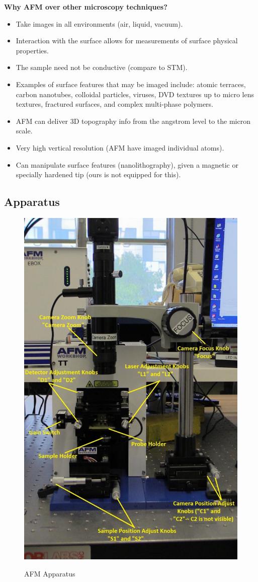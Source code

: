 \documentclass{../lab}
\begin{document}
\textbf{Why AFM over other microscopy techniques?}
\begin{itemize}
    \item Take images in all environments (air, liquid, vacuum).

    \item Interaction with the surface allows for measurements of surface physical properties.

    \item The sample need not be conductive (compare to STM).

    \item Examples of surface features that may be imaged include: atomic terraces, carbon nanotubes, colloidal particles, viruses, DVD textures up to micro lens textures, fractured surfaces, and complex multi-phase polymers.

    \item AFM can deliver 3D topography info from the angstrom level to the micron scale.

    \item Very high vertical resolution (AFM have imaged individual atoms).

    \item Can manipulate surface features (nanolithography), given a magnetic or specially hardened tip (ours is not equipped for this).

\end{itemize}

\subsection{Apparatus}

\begin{figure}[h]
\centering
    \href{http://experimentationlab.berkeley.edu/sites/default/files/AFMImages/AFMgen.jpg}{\includegraphics[width=0.5\linewidth]{images/AFMgen.jpg}}
    \caption{AFM Apparatus}
\end{figure}
\end{document}
